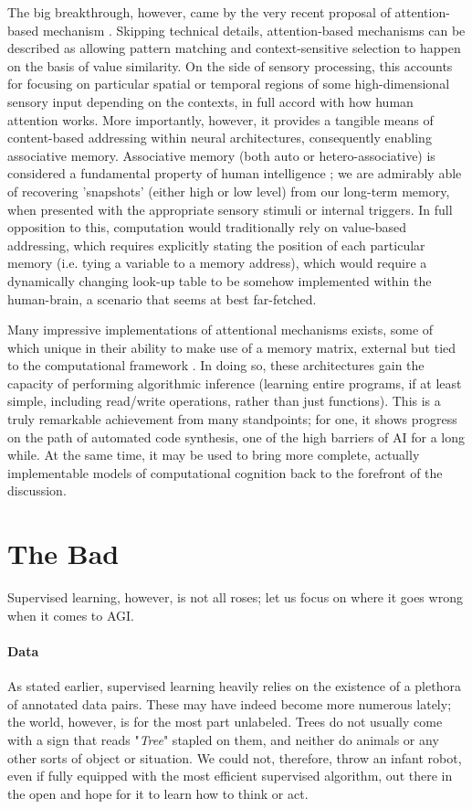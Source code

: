 \documentclass[]{article}
\begin{document}
The big breakthrough, however, came by the very recent proposal of attention-based mechanism \cite{DBLP:journals/corr/MnihHGK14}. Skipping technical details, attention-based mechanisms can be described as allowing pattern matching and context-sensitive selection to happen on the basis of value similarity. On the side of sensory processing, this accounts for focusing on particular spatial or temporal regions of some high-dimensional sensory input depending on the contexts, in full accord with how human attention works. More importantly, however, it provides a tangible means of content-based addressing within neural architectures, consequently enabling associative memory. Associative memory (both auto or hetero-associative) is considered a fundamental property of human intelligence \cite{blah, Hopfield1982}; we are admirably able of recovering 'snapshots' (either high or low level) from our long-term memory, when presented with the appropriate sensory stimuli or internal triggers. In full opposition to this, computation would traditionally rely on value-based addressing, which requires explicitly stating the position of each particular memory (i.e. tying a variable to a memory address), which would require a dynamically changing look-up table to be somehow implemented within the human-brain, a scenario that seems at best far-fetched.

Many impressive implementations of attentional mechanisms exists, some of which unique in their ability to make use of a memory matrix, external but tied to the computational framework \cite{NIPS2015_5846, Graves2016}. In doing so, these architectures gain the capacity of performing algorithmic inference (learning entire programs, if at least simple, including read/write operations, rather than just functions). This is a truly remarkable achievement from many standpoints; for one, it shows progress on the path of automated code synthesis, one of the high barriers of AI for a long while. At the same time, it may be used to bring more complete, actually implementable models of computational cognition back to the forefront of the discussion.

\section{The Bad}
Supervised learning, however, is not all roses; let us focus on where it goes wrong when it comes to AGI.

\paragraph{Data}
As stated earlier, supervised learning heavily relies on the existence of a plethora of annotated data pairs. These may have indeed become more numerous lately; the world, however, is for the most part unlabeled. Trees do not usually come with a sign that reads "\textit{Tree}" stapled on them, and neither do animals or any other sorts of object or situation. We could not, therefore, throw an infant robot, even if fully equipped with the most efficient supervised algorithm, out there in the open and hope for it to learn how to think or act. 
\end{document}
